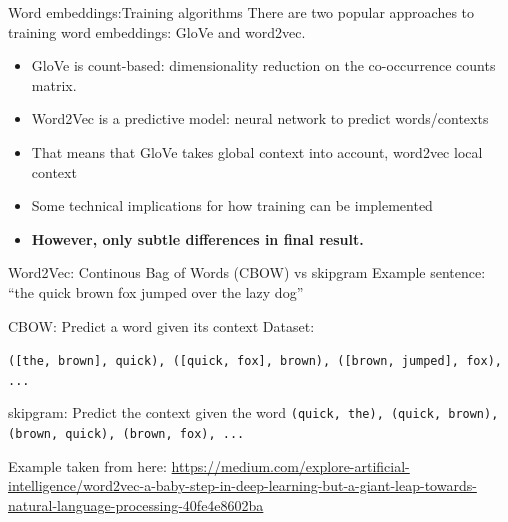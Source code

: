 \documentclass[compress]{beamer}
\begin{document}
\begin{frame}{Word embeddings:Training algorithms}
	There are two popular approaches to training word embeddings: GloVe and word2vec.
	\begin{itemize}
		\item GloVe is count-based: dimensionality reduction on the co-occurrence counts matrix.
		\item Word2Vec is a predictive model: neural network to predict words/contexts
		\item That means that GloVe takes global context into account, word2vec local context
		\item Some technical implications for how training can be implemented 
		\item \textbf{However, only subtle differences in final result.}
	\end{itemize}
	
\end{frame}

\begin{frame}{Word2Vec: Continous Bag of Words (CBOW) vs skipgram}
	Example sentence: ``the quick brown fox jumped over the lazy dog''
	\begin{block}{CBOW: Predict a word given its context}
		Dataset:
		
		\texttt{([the, brown], quick), ([quick, fox], brown), ([brown, jumped], fox), ...}
	\end{block}
	
	\pause
	
	
	\begin{block}{skipgram: Predict the context given the word}	
		\texttt{(quick, the), (quick, brown), (brown, quick), (brown, fox), ...}
	\end{block}
	
	\tiny{Example taken from here: \url{https://medium.com/explore-artificial-intelligence/word2vec-a-baby-step-in-deep-learning-but-a-giant-leap-towards-natural-language-processing-40fe4e8602ba}}
\end{frame}

\end{document}
